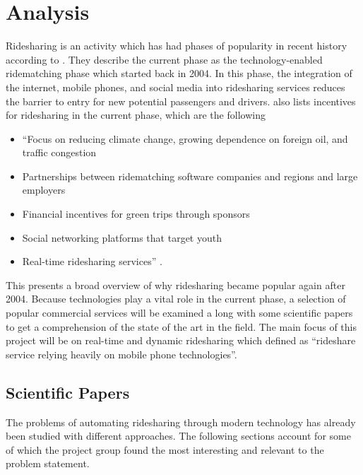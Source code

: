 \section{Analysis}
Ridesharing is an activity which has had phases of popularity in recent history according to \citet{doi:10.1080/01441647.2011.621557}.
They describe the current phase as the technology-enabled ridematching phase which started back in 2004.
In this phase, the integration of the internet, mobile phones, and social media into ridesharing services reduces the barrier to entry for new potential passengers and drivers.
\citet{doi:10.1080/01441647.2011.621557} also lists incentives for ridesharing in the current phase, which are the following 

\begin{itemize}
  \item ``Focus on reducing climate change, growing dependence on foreign oil, and traffic congestion
  \item Partnerships between ridematching software companies and regions and large employers
  \item Financial incentives for green trips through sponsors
  \item Social networking platforms that target youth
  \item Real-time ridesharing services'' \citep{doi:10.1080/01441647.2011.621557}.
\end{itemize}

This presents a broad overview of why ridesharing became popular again after 2004.
Because technologies play a vital role in the current phase, a selection of popular commercial services will be examined a	long with some scientific papers to get a comprehension of the state of the art in the field.
The main focus of this project will be on real-time and dynamic ridesharing which \citet{amey2011real} defined as ``rideshare service relying heavily on mobile phone technologies''.

\subsection{Scientific Papers}
The problems of automating ridesharing through modern technology has already been studied with different approaches.
The following sections account for some of which the project group found the most interesting and relevant to the problem statement. 

